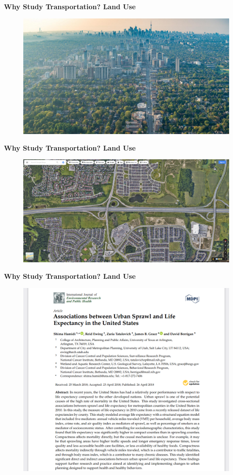 \documentclass[aspectratio=169]{beamer}
\begin{document}





\begin{frame}
	\textbf{Why Study Transportation? Land Use}
	\begin{figure}
		\centering
		\includegraphics[width=0.9\linewidth]{images/i3.png}
	\end{figure}
\end{frame}

\begin{frame}
	\textbf{Why Study Transportation? Land Use}
	\begin{figure}
		\centering
		\includegraphics[width=0.9\linewidth]{images/sprawl_markham407.png}
	\end{figure}
\end{frame}


\begin{frame}
	\textbf{Why Study Transportation? Land Use}
	\begin{figure}
		\centering
		\includegraphics[width=0.6\linewidth]{images/sprawl_life_expectancy.png}
	\end{figure}
\end{frame}
\end{document}
